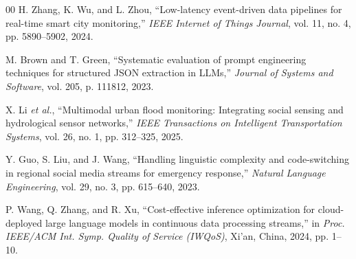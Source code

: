 \documentclass[conference]{IEEEtran}
\begin{document}
\begin{thebibliography}{00}
H. Zhang, K. Wu, and L. Zhou, ``Low-latency event-driven data pipelines for real-time smart city monitoring,'' \emph{IEEE Internet of Things Journal}, vol. 11, no. 4, pp. 5890--5902, 2024.

M. Brown and T. Green, ``Systematic evaluation of prompt engineering techniques for structured JSON extraction in LLMs,'' \emph{Journal of Systems and Software}, vol. 205, p. 111812, 2023.

X. Li \emph{et al.}, ``Multimodal urban flood monitoring: Integrating social sensing and hydrological sensor networks,'' \emph{IEEE Transactions on Intelligent Transportation Systems}, vol. 26, no. 1, pp. 312--325, 2025.

Y. Guo, S. Liu, and J. Wang, ``Handling linguistic complexity and code-switching in regional social media streams for emergency response,'' \emph{Natural Language Engineering}, vol. 29, no. 3, pp. 615--640, 2023.

P. Wang, Q. Zhang, and R. Xu, ``Cost-effective inference optimization for cloud-deployed large language models in continuous data processing streams,'' in \emph{Proc. IEEE/ACM Int. Symp. Quality of Service (IWQoS)}, Xi'an, China, 2024, pp. 1--10.

\end{thebibliography}
\end{document}

